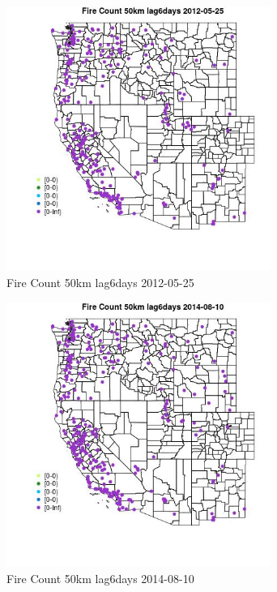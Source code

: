 \begin{figure} 
\centering  
\includegraphics[width=0.77\textwidth]{Code_Outputs/Report_ML_input_PM25_Step4_part_e_de_duplicated_aves_compiled_2019-05-18wNAs_MapObsFire_Count_50km_lag6days2012-05-25.jpg} 
\caption{\label{fig:Report_ML_input_PM25_Step4_part_e_de_duplicated_aves_compiled_2019-05-18wNAsMapObsFire_Count_50km_lag6days2012-05-25}Fire Count 50km lag6days 2012-05-25} 
\end{figure} 
 

\begin{figure} 
\centering  
\includegraphics[width=0.77\textwidth]{Code_Outputs/Report_ML_input_PM25_Step4_part_e_de_duplicated_aves_compiled_2019-05-18wNAs_MapObsFire_Count_50km_lag6days2014-08-10.jpg} 
\caption{\label{fig:Report_ML_input_PM25_Step4_part_e_de_duplicated_aves_compiled_2019-05-18wNAsMapObsFire_Count_50km_lag6days2014-08-10}Fire Count 50km lag6days 2014-08-10} 
\end{figure} 
 

